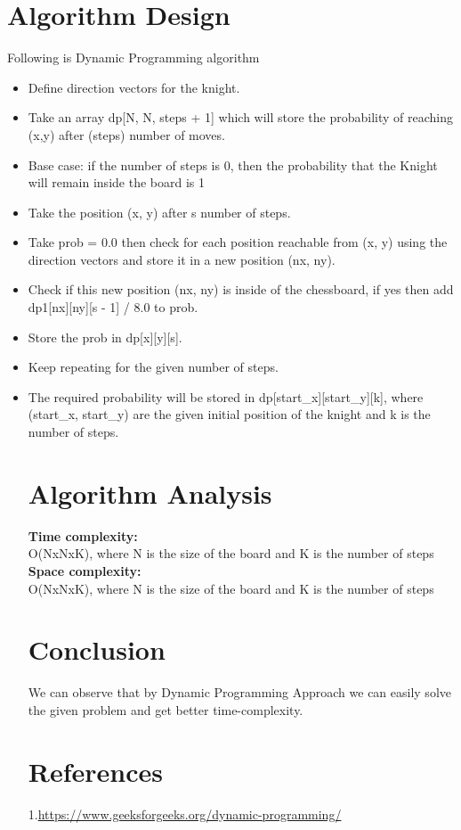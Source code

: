 \documentclass[conference]{IEEEtran}
\begin{document}
\section{Algorithm Design}
Following is Dynamic Programming algorithm

\begin{itemize}
\item Define direction vectors for the knight. 
\item Take an array dp[N, N, steps + 1] which will store the probability of reaching (x,y) after (steps) number of moves.
\item Base case: if the number of steps is 0, then the probability that the Knight will remain inside the board is 1
\item Take the position (x, y) after s number of steps.
\item Take prob = 0.0 then check for each position reachable from (x, y) using the direction vectors and store it in a new position (nx, ny).
\item Check if this new position (nx, ny) is inside of the chessboard, if yes then add dp1[nx][ny][s - 1] / 8.0 to prob.
\item Store the prob in dp[x][y][s].
\item Keep repeating for the given number of steps.
\item The required probability will be stored in dp[start_x][start_y][k], where (start_x, start_y) are the given initial position of the knight and k is the number of steps.


\section{Algorithm Analysis}
\textbf{Time complexity:}\\

O(NxNxK), where N is the size of the board and K is the number of steps
\\
\textbf{Space complexity:}\\

O(NxNxK), where N is the size of the board and K is the number of steps

\section{Conclusion}
We can observe that by Dynamic Programming Approach we can easily solve the given problem and get better time-complexity.

 \section{References}
\color{blue}1.{\url{https://www.geeksforgeeks.org/dynamic-programming/} }\\



\end{itemize}
\end{document}
